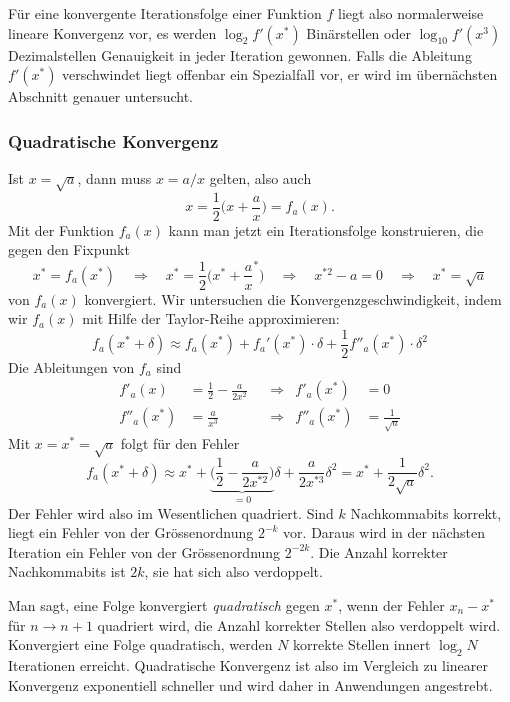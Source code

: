 Für eine konvergente Iterationsfolge einer Funktion $f$ liegt also
normalerweise lineare Konvergenz vor, es werden $\log_2 f'(x^*)$
Binärstellen oder $\log_{10}f'(x^3)$ Dezimalstellen Genauigkeit in
jeder Iteration gewonnen.
Falls die Ableitung $f'(x^*)$ verschwindet liegt offenbar ein
Spezialfall vor, er wird im übernächsten Abschnitt genauer untersucht.

\subsubsection{Quadratische Konvergenz}
%
%
Ist $x=\sqrt{a}$, dann muss $x = a/x$ gelten, also auch
\[
x = \frac12\biggl(x+\frac{a}x\biggr) = f_a(x).
\]
Mit der Funktion $f_a(x)$ kann man jetzt ein Iterationsfolge konstruieren,
die gegen den Fixpunkt 
\[
x^*=f_a(x^*)
\quad\Rightarrow\quad
x^*=\frac12\biggl(x^*+\frac{a}x^*\biggr)
\quad\Rightarrow\quad
x^{*2}-a=0
\quad\Rightarrow\quad
x^*=\sqrt{a}
\]
von $f_a(x)$ konvergiert.
Wir untersuchen die Konvergenzgeschwindigkeit, indem wir $f_a(x)$
mit Hilfe der Taylor-Reihe approximieren:
%
\[
f_a(x^*+\delta)
\approx
f_a(x^*) + f_a'(x^*)\cdot\delta + \frac12f''_a(x^*)\cdot\delta^2
\]
Die Ableitungen von $f_a$ sind
\begin{align*}
f'_a(x)
&=
\frac12 -\frac{a}{2x^2}
&&\Rightarrow&
f'_a(x^*)&=0
\\
f''_a(x^*)
&=
\frac{a}{x^3}
&&\Rightarrow&
f''_a(x^*)&=\frac{1}{\!\sqrt{a}}
\end{align*}
Mit $x=x^* =\sqrt{a}$ folgt für den Fehler
\[
f_a(x^*+\delta)
\approx
x^* + \underbrace{\biggl(\frac12-\frac{a}{2x^{*2}}\biggr)}_{\displaystyle=0}\delta
+
\frac{a}{2x^{*3}}\delta^2
=
x^* + \frac{1}{2\sqrt{a}}\delta^2.
\]
Der Fehler wird also im Wesentlichen quadriert.
Sind $k$ Nachkommabits korrekt, liegt ein Fehler von der Grössenordnung
$2^{-k}$ vor. 
Daraus wird in der nächsten Iteration ein Fehler von der Grössenordnung
$2^{-2k}$.
Die Anzahl korrekter Nachkommabits ist $2k$, sie hat sich also
verdoppelt.

Man sagt, eine Folge konvergiert {\em quadratisch} gegen $x^*$,
wenn der Fehler $x_n-x^*$ für $n\to n+1$ quadriert wird, die Anzahl
korrekter Stellen also verdoppelt wird.
%
%
Konvergiert eine Folge quadratisch, werden $N$ korrekte Stellen
innert $\log_2N$ Iterationen erreicht.
Quadratische Konvergenz ist also im Vergleich zu linearer Konvergenz
exponentiell schneller und wird daher in Anwendungen angestrebt.
%

